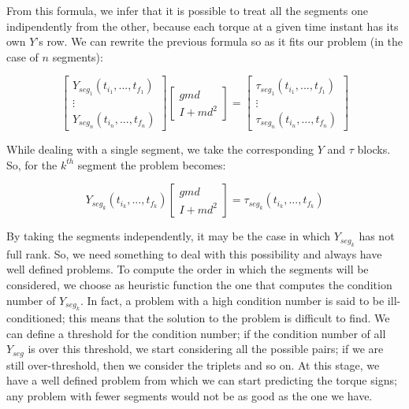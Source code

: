 \documentclass{article}
\begin{document}
From this formula, we infer that it is possible to treat all the segments one indipendently from the other, because each torque at a given time instant has its own $Y$'s row. We can rewrite the previous formula so as it fits our problem (in the case of $n$ segments):

\vspace{1em}
\[\begin{bmatrix}
Y_{seg_1}(t_{i_1}, ..., t_{f_1})\\
\vdots \\
Y_{seg_n}(t_{i_n}, ..., t_{f_n})
\end{bmatrix} \begin{bmatrix}
gmd \\ I +md^2
\end{bmatrix} = \begin{bmatrix}
\tau_{seg_1}(t_{i_1}, ..., t_{f_1})\\
\vdots \\
\tau_{seg_n}(t_{i_n}, ..., t_{f_n})
\end{bmatrix} \]
\vspace{1em}

While dealing with a single segment, we take the corresponding $Y$ and $\tau$  blocks. So, for the $k^{th}$ segment the problem becomes:

\[Y_{seg_k}(t_{i_k}, ..., t_{f_k})
\begin{bmatrix}
gmd \\ I +md^2
\end{bmatrix} =
\tau_{seg_k}(t_{i_k}, ..., t_{f_k})\]

By taking the segments independently, it may be the case in which $Y_{seg_k}$ has not full rank. So, we need something to deal with this possibility and always have well defined problems. To compute the order in which the segments will be considered, we choose as heuristic function  the one that computes the condition number of $Y_{seg_k}$. In fact, a problem with a high condition number is said to be ill-conditioned; this means that the solution to the problem is difficult to find. We can define a threshold for the condition number; if the condition number of all $Y_{seg}$ is over this threshold, we start considering all the possible pairs; if we are still over-threshold, then we consider the triplets and so on. At this stage, we have a well defined problem from which we can start predicting the torque signs; any problem with fewer segments would not be as good as the one we have.
\end{document}
